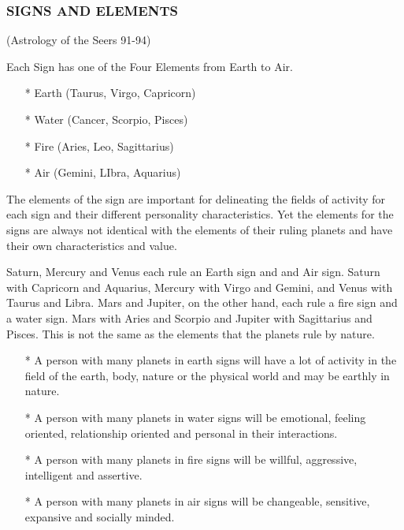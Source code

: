  

\subsubsection{SIGNS AND ELEMENTS} (Astrology of the Seers 91-94)

 

Each Sign has one of the Four Elements from Earth to Air.

 

\begin{enumerate}
\item[*] Earth (Taurus, Virgo, Capricorn)
\item[*] Water (Cancer, Scorpio, Pisces)
\item[*] Fire (Aries, Leo, Sagittarius)
\item[*] Air (Gemini, LIbra, Aquarius)
 \end{enumerate}

The elements of the sign are important for delineating the fields of activity for each sign and their different personality characteristics. Yet the elements for the signs are always not identical with the elements of their ruling planets and have their own characteristics and value.

Saturn, Mercury and Venus each rule an Earth sign and and Air sign. Saturn with Capricorn and Aquarius, Mercury with Virgo and Gemini, and Venus with Taurus and Libra. Mars and Jupiter, on the other hand, each rule a fire sign and a water sign. Mars with Aries and Scorpio and Jupiter with Sagittarius and Pisces. This is not the same as the elements that the planets rule by nature.

 

\begin{enumerate}
\item[*] A person with many planets in earth signs will have a lot of activity in the field of the earth, body, nature or the physical world and may be earthly in nature.
\item[*] A person with many planets in water signs will be emotional, feeling oriented, relationship oriented and personal in their interactions.
\item[*] A person with many planets in fire signs will be willful, aggressive, intelligent and assertive.
\item[*] A person with many planets in air signs will be changeable, sensitive, expansive and socially minded.
  \end{enumerate}

